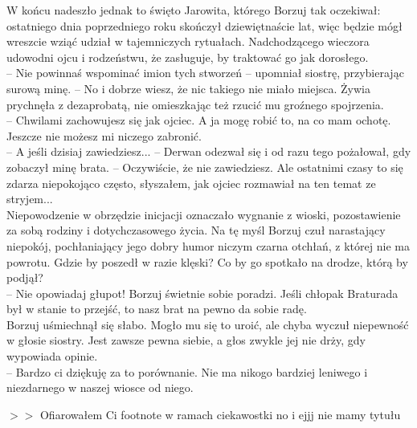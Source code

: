 \documentclass[12pt]{book}
\begin{document}
W końcu nadeszło jednak to święto Jarowita, którego Borzuj tak oczekiwał: ostatniego dnia poprzedniego roku skończył dziewiętnaście lat, więc będzie mógł wreszcie wziąć udział w tajemniczych rytuałach. Nadchodzącego wieczora udowodni ojcu i rodzeństwu, że zasługuje, by traktować go jak dorosłego. \\
-- Nie powinnaś wspominać imion tych stworzeń -- upomniał siostrę, przybierając surową minę. -- No i dobrze wiesz, że nic takiego nie miało miejsca.
Żywia prychnęła z dezaprobatą, nie omieszkając też rzucić mu groźnego spojrzenia.\\
-- Chwilami zachowujesz się jak ojciec. A ja mogę robić to, na co mam ochotę. Jeszcze nie możesz mi niczego zabronić.\\
-- A jeśli dzisiaj zawiedziesz... -- Derwan odezwał się i od razu tego pożałował, gdy zobaczył minę brata. -- Oczywiście, że nie zawiedziesz. Ale ostatnimi czasy to się zdarza niepokojąco często, słyszałem, jak ojciec rozmawiał na ten temat ze stryjem...\\
Niepowodzenie w obrzędzie inicjacji oznaczało wygnanie z wioski, pozostawienie za sobą rodziny i dotychczasowego życia. Na tę myśl Borzuj czuł narastający niepokój, pochłaniający jego dobry humor niczym czarna otchłań, z której nie ma powrotu. Gdzie by poszedł w razie klęski? Co by go spotkało na drodze, którą by podjął?\\
-- Nie opowiadaj głupot! Borzuj świetnie sobie poradzi. Jeśli chłopak Braturada był w stanie to przejść, to nasz brat na pewno da sobie radę.\\
Borzuj uśmiechnął się słabo. Mogło mu się to uroić, ale chyba wyczuł niepewność w głosie siostry. Jest zawsze pewna siebie, a głos zwykle jej nie drży, gdy wypowiada opinie.\\
-- Bardzo ci dziękuję za to porównanie. Nie ma nikogo bardziej leniwego i niezdarnego w naszej wiosce od niego.\par



$>>$
Ofiarowałem Ci footnote w ramach ciekawostki no i ejjj nie mamy tytułu
\end{document}
